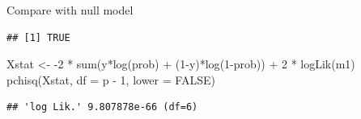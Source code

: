\documentclass[
  ignorenonframetext,
]{beamer}
\newenvironment{Shaded}{\begin{snugshade}}{\end{snugshade}}
\newcommand{\AttributeTok}[1]{\textcolor[rgb]{0.77,0.63,0.00}{#1}}
\newcommand{\ConstantTok}[1]{\textcolor[rgb]{0.00,0.00,0.00}{#1}}
\newcommand{\DecValTok}[1]{\textcolor[rgb]{0.00,0.00,0.81}{#1}}
\newcommand{\FunctionTok}[1]{\textcolor[rgb]{0.00,0.00,0.00}{#1}}
\newcommand{\NormalTok}[1]{#1}
\newcommand{\OtherTok}[1]{\textcolor[rgb]{0.56,0.35,0.01}{#1}}
\newcommand{\SpecialCharTok}[1]{\textcolor[rgb]{0.00,0.00,0.00}{#1}}
\begin{document}
\begin{frame}[fragile]{Compare with null model}
\begin{verbatim}
## [1] TRUE
\end{verbatim}

\begin{Shaded}
\begin{Highlighting}[]
\NormalTok{Xstat }\OtherTok{\textless{}{-}} \SpecialCharTok{{-}}\DecValTok{2} \SpecialCharTok{*} \FunctionTok{sum}\NormalTok{(y}\SpecialCharTok{*}\FunctionTok{log}\NormalTok{(prob) }\SpecialCharTok{+}\NormalTok{ (}\DecValTok{1}\SpecialCharTok{{-}}\NormalTok{y)}\SpecialCharTok{*}\FunctionTok{log}\NormalTok{(}\DecValTok{1}\SpecialCharTok{{-}}\NormalTok{prob)) }\SpecialCharTok{+} \DecValTok{2} \SpecialCharTok{*} \FunctionTok{logLik}\NormalTok{(m1)}
\FunctionTok{pchisq}\NormalTok{(Xstat, }\AttributeTok{df =}\NormalTok{ p }\SpecialCharTok{{-}} \DecValTok{1}\NormalTok{, }\AttributeTok{lower =} \ConstantTok{FALSE}\NormalTok{)}
\end{Highlighting}
\end{Shaded}

\begin{verbatim}
## 'log Lik.' 9.807878e-66 (df=6)
\end{verbatim}
\end{frame}
\end{document}
